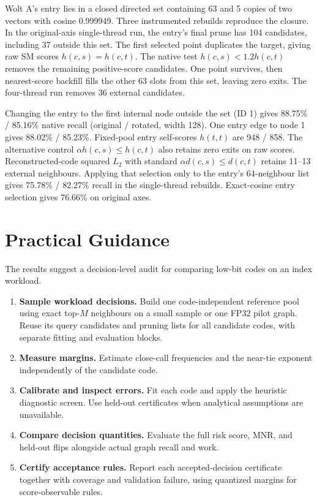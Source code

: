 \documentclass[twoside,11pt]{article}
\begin{document}
Wolt A's entry lies in a closed directed set containing 63 and 5 copies of two vectors with cosine 0.999949. Three instrumented rebuilds reproduce the closure. In the original-axis single-thread run, the entry's final prune has 104 candidates, including 37 outside this set. The first selected point duplicates the target, giving raw SM scores $h(c,s)=h(c,t)$. The native test $h(c,s)<1.2h(c,t)$ removes the remaining positive-score candidates. One point survives, then nearest-score backfill fills the other 63 slots from this set, leaving zero exits. The four-thread run removes 36 external candidates.

Changing the entry to the first internal node outside the set (ID 1) gives 88.75\% / 85.16\% native recall (original / rotated, width 128). One entry edge to node 1 gives 88.02\% / 85.23\%. Fixed-pool entry self-scores $h(t,t)$ are 948 / 858. The alternative control $\alpha h(c,s)\le h(c,t)$ also retains zero exits on raw scores. Reconstructed-code squared $L_2$ with standard $\alpha d(c,s)\le d(c,t)$ retains 11--13 external neighbours. Applying that selection only to the entry's 64-neighbour list gives 75.78\% / 82.27\% recall in the single-thread rebuilds. Exact-cosine entry selection gives 76.66\% on original axes.

\section{Practical Guidance}
\label{sec:guidance}

The results suggest a decision-level audit for comparing low-bit codes on an index workload.

\begin{enumerate}
\setlength{\itemsep}{2pt}
\setlength{\parsep}{0pt}
\item \textbf{Sample workload decisions.} Build one code-independent reference pool using exact top-$M$ neighbours on a small sample or one FP32 pilot graph. Reuse its query candidates and pruning lists for all candidate codes, with separate fitting and evaluation blocks.
\item \textbf{Measure margins.} Estimate close-call frequencies and the near-tie exponent independently of the candidate code.
\item \textbf{Calibrate and inspect errors.} Fit each code and apply the heuristic diagnostic screen. Use held-out certificates when analytical assumptions are unavailable.
\item \textbf{Compare decision quantities.} Evaluate the full risk score, MNR, and held-out flips alongside actual graph recall and work.
\item \textbf{Certify acceptance rules.} Report each accepted-decision certificate together with coverage and validation failure, using quantized margins for score-observable rules.
\end{enumerate}
\end{document}
